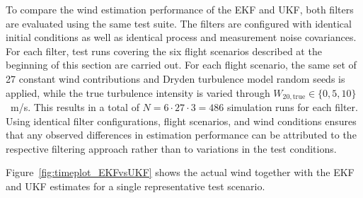 To compare the wind estimation performance of the EKF and UKF, both filters are evaluated using the same test suite. The filters are configured with identical initial conditions as well as identical process and measurement noise covariances. For each filter, test runs covering the six flight scenarios described at the beginning of this section are carried out. For each flight scenario, the same set of 27 constant wind contributions and Dryden turbulence model random seeds is applied, while the true turbulence intensity is varied through $W_{20,\mathrm{true}} \in \{0,5,10\}$\SI{}{m/s}. This results in a total of $N = 6 \cdot 27 \cdot 3 = 486$ simulation runs for each filter. Using identical filter configurations, flight scenarios, and wind conditions ensures that any observed differences in estimation performance can be attributed to the respective filtering approach rather than to variations in the test conditions.

Figure~\ref{fig:timeplot_EKFvsUKF} shows the actual wind together with the EKF and UKF estimates for a single representative test scenario. 

